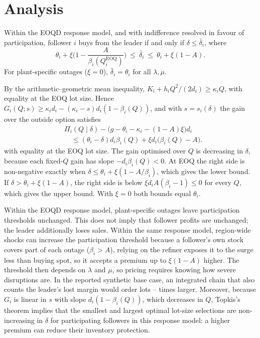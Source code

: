 \documentclass{ifacconf}
\newcommand{\rev}[1]{#1}
\newcommand{\MissingResult}{\ifmmode\text{\normalfont\color{red}\footnotesize[missing]}\else{\normalfont\color{red}\footnotesize[missing]}\fi}
\providecommand{\IntRatioMax}{\MissingResult}
\providecommand{\IntRatioMin}{\MissingResult}
\newcommand{\dl}{\delta}
\begin{document}
\section{Analysis}
\begin{lem}[Participation]\label{lem:part}
\rev{Within the EOQD response model, and with indifference resolved in favour of participation, follower $i$ buys from the leader if and only if $\dl\le\bar\dl_i$, where}
\begin{equation}
\theta_i+\xi\Big(1-\frac{A}{\beta_i(Q_i^{\text{EOQ}})}\Big)\ \le\ \bar\dl_i\ \le\ \theta_i+\xi(1-A).
\end{equation}
For plant-specific outages ($\xi=0$), $\bar\dl_i=\theta_i$ for all $\lambda,\mu$.
\end{lem}
\begin{pf}
By the arithmetic--geometric mean inequality, $K_i+h_iQ^2/(2d_i)\ge\kappa_iQ$, with equality at the EOQ lot size. Hence $G_i(Q;s)\ge\kappa_id_i-(\kappa_i-s)d_i(1-\beta_i(Q))$, and with $s=s_i(\dl)$ the gain over the outside option satisfies
\begin{equation}
\begin{aligned}
&\Pi_i(Q\mid\dl)-\big(g-\theta_i-\kappa_i-(1-A)\xi\big)d_i\\
&\quad \le (\theta_i-\dl)d_i\beta_i(Q)+\xi d_i\big(\beta_i(Q)-A\big).
\end{aligned}
\end{equation}
\rev{with equality at the EOQ lot size. The gain optimised over $Q$ is decreasing in $\dl$, because each fixed-$Q$ gain has slope $-d_i\beta_i(Q)<0$. At EOQ the right side is non-negative exactly when} $\dl\le\theta_i+\xi(1-A/\beta_i)$, which gives the lower bound. If $\dl>\theta_i+\xi(1-A)$, the right side is below $\xi d_iA(\beta_i-1)\le0$ for every $Q$, which gives the upper bound. With $\xi=0$ both bounds equal $\theta_i$.
\end{pf}
\noindent \rev{Within the EOQD response model, plant-specific outages leave participation thresholds unchanged. This does not imply that follower profits are unchanged; the leader additionally loses sales.} \rev{Within the same response model, region-wide shocks can increase the participation threshold} because a follower's own stock covers part of each outage ($\beta_i>A$), relying on the refiner exposes it to the surge less than buying spot, so it accepts a premium up to $\xi(1-A)$ higher. The threshold then depends on $\lambda$ and $\mu$, so pricing requires knowing how severe disruptions are. \rev{In the reported synthetic base case, an integrated chain that also counts the leader's lost margin would order lots} \IntRatioMin--\IntRatioMax{} times larger. Moreover, because $G_i$ is linear in $s$ with slope $d_i(1-\beta_i(Q))$, which decreases in $Q$, \rev{Topkis's theorem implies that the smallest and largest optimal lot-size selections are non-increasing in $\dl$ for participating followers in this response model: a higher premium can reduce their inventory protection.}
\end{document}
